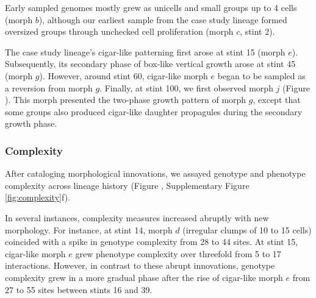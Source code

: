 Early sampled genomes mostly grew as unicells and small groups up to 4 cells (morph $b$), although our earliest sample from the case study lineage formed oversized groups through unchecked cell proliferation (morph $c$, stint 2).

The case study lineage's cigar-like patterning first arose at stint 15 (morph $e$).
Subsequently, its secondary phase of box-like vertical growth arose at stint 45 (morph $g$).
However, around stint 60, cigar-like morph $e$ began to be sampled as a reversion from morph $g$.
Finally, at stint 100, we first observed morph $j$ (Figure ).
This morph presented the two-phase growth pattern of morph $g$, except that some groups also produced cigar-like daughter propagules during the secondary growth phase.

\subsubsection{Complexity}

After cataloging morphological innovations, we assayed genotype and phenotype complexity across lineage history (Figure , Supplementary Figure \ref{fig:complexity}f).

In several instances, complexity measures increased abruptly with new morphology.
For instance, at stint 14, morph $d$ (irregular clumps of 10 to 15 cells) coincided with a spike in genotype complexity from 28 to 44 sites.
At stint 15, cigar-like morph $e$ grew phenotype complexity over threefold from 5 to 17 interactions.
However, in contrast to these abrupt innovations, genotype complexity grew in a more gradual phase after the rise of cigar-like morph $e$ from 27 to 55 sites between stints 16 and 39.


